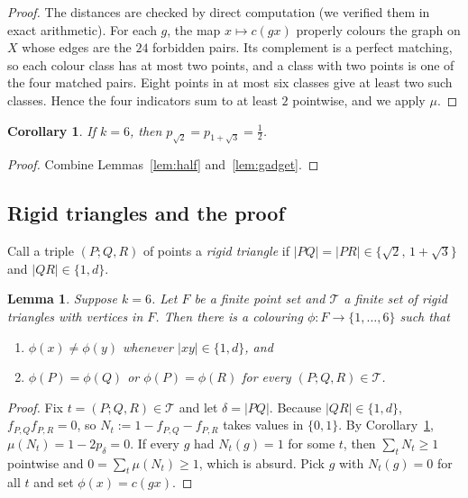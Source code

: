 \documentclass[11pt,a4paper]{amsart}
\newtheorem{lemma}[theorem]{Lemma}
\newtheorem{corollary}[theorem]{Corollary}
\theoremstyle{remark}
\begin{document}
\begin{proof}
The distances are checked by direct computation (we verified them in exact arithmetic). For each $g$, the map $x\mapsto c(gx)$ properly colours the graph on $X$ whose edges are the $24$ forbidden pairs. Its complement is a perfect matching, so each colour class has at most two points, and a class with two points is one of the four matched pairs. Eight points in at most six classes give at least two such classes. Hence the four indicators sum to at least $2$ pointwise, and we apply $\mu$.
\end{proof}

\begin{corollary}\label{cor:equal}
If $k=6$, then $p_{\sqrt2}=p_{1+\sqrt3}=\tfrac12$.
\end{corollary}

\begin{proof}
Combine Lemmas~\ref{lem:half} and~\ref{lem:gadget}.
\end{proof}

\subsection{Rigid triangles and the proof}

Call a triple $(P;Q,R)$ of points a \emph{rigid triangle} if $|PQ|=|PR|\in\{\sqrt2,\,1+\sqrt3\}$ and $|QR|\in\{1,d\}$.

\begin{lemma}\label{lem:finite}
Suppose $k=6$. Let $F$ be a finite point set and $\mathcal T$ a finite set of rigid triangles with vertices in $F$. Then there is a colouring $\phi\colon F\to\{1,\dots,6\}$ such that
\begin{enumerate}
\item $\phi(x)\ne\phi(y)$ whenever $|xy|\in\{1,d\}$, and
\item $\phi(P)=\phi(Q)$ or $\phi(P)=\phi(R)$ for every $(P;Q,R)\in\mathcal T$.
\end{enumerate}
\end{lemma}

\begin{proof}
Fix $t=(P;Q,R)\in\mathcal T$ and let $\delta=|PQ|$. Because $|QR|\in\{1,d\}$, $f_{P,Q}f_{P,R}=0$, so $N_t:=1-f_{P,Q}-f_{P,R}$ takes values in $\{0,1\}$. By Corollary~\ref{cor:equal}, $\mu(N_t)=1-2p_\delta=0$. If every $g$ had $N_t(g)=1$ for some $t$, then $\sum_t N_t\ge1$ pointwise and $0=\sum_t\mu(N_t)\ge1$, which is absurd. Pick $g$ with $N_t(g)=0$ for all $t$ and set $\phi(x)=c(gx)$.
\end{proof}
\end{document}
